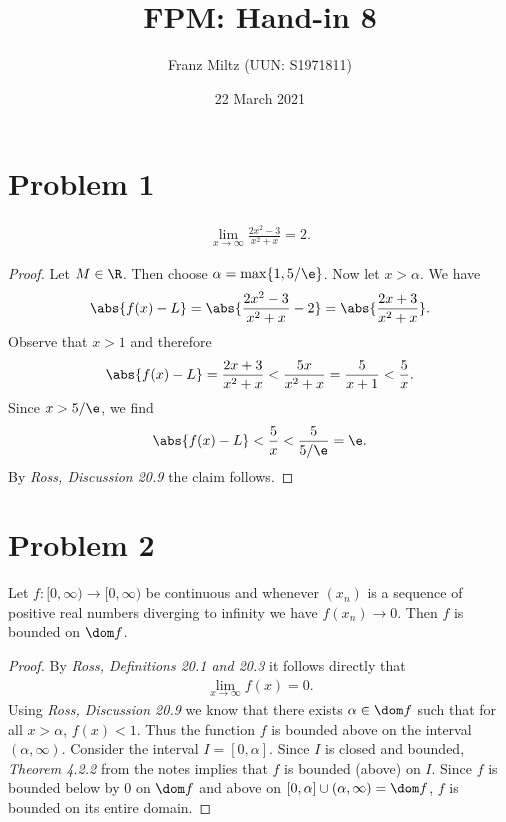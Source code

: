 \documentclass{article}
\begin{document}
\title{FPM: Hand-in 8}
\author{Franz Miltz (UUN: S1971811)}
\date{22 March 2021}
\maketitle
\mkthms
\section*{Problem 1}

\begin{claim*}
	\begin{align*}
		\lim_{x\to\infty} \frac{2x^2-3}{x^2+x}=2.
	\end{align*}
\end{claim*}

\begin{proof}
	Let $M\in\R$. Then choose $\alpha=\max\{1, 5/\e\}$. Now let $x>\alpha$.
	We have
	\begin{align*}
		\abs{f(x)-L} = \abs{\frac{2x^2-3}{x^2+x}-2} = \abs{\frac{2x+3}{x^2+x}}.
	\end{align*}
	Observe that $x>1$ and therefore
	\begin{align*}
		\abs{f(x)-L} = \frac{2x+3}{x^2+x}< \frac{5x}{x^2+x} = \frac{5}{x+1} < \frac{5}{x}.
	\end{align*}
	Since $x>5/\e$, we find
	\begin{align*}
		\abs{f(x)-L} < \frac{5}{x} < \frac{5}{5/\e} = \e.
	\end{align*}
	By \emph{Ross, Discussion 20.9} the claim follows.
\end{proof}

\section*{Problem 2}

\begin{claim*}
	Let $f:[0,\infty)\to[0,\infty)$ be continuous and whenever
	$(x_n)$ is a sequence of positive real numbers diverging to
	infinity we have $f(x_n)\to 0$. Then $f$ is bounded on $\dom f$.
\end{claim*}

\begin{proof}
	By \emph{Ross, Definitions 20.1 and 20.3} it follows directly that
	\begin{align*}
		\lim_{x\to \infty} f(x) = 0.
	\end{align*}
	Using \emph{Ross, Discussion 20.9} we know that there
	exists $\alpha\in \dom f$ such that for all $x>\alpha$, $f(x)<1$.
	Thus the function $f$ is bounded above on the interval
	$(\alpha, \infty)$. Consider the interval $I=[0,\alpha]$. Since $I$
	is closed and bounded, \emph{Theorem 4.2.2} from the notes implies
	that $f$ is bounded (above) on $I$. Since $f$ is bounded below by
	$0$ on $\dom f$ and above on $[0,\alpha]\cup(\alpha,\infty)=\dom f$,
	$f$ is bounded on its entire domain.
\end{proof}
\end{document}
